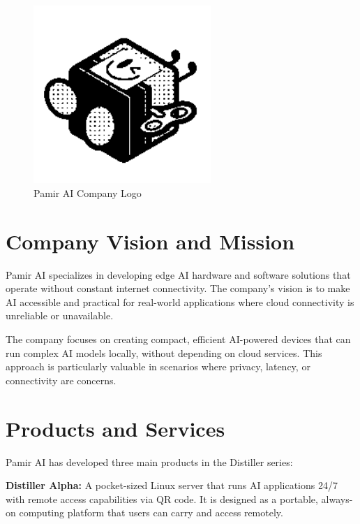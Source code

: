 \documentclass[12pt,a4paper]{report}
\begin{document}
\begin{figure}[htbp]
    \centering
    \includegraphics[width=0.6\textwidth]{pamirai_logo.png}
    \caption{Pamir AI Company Logo}
\end{figure}

\section{Company Vision and Mission}

Pamir AI specializes in developing edge AI hardware and software solutions that operate without constant internet connectivity. The company's vision is to make AI accessible and practical for real-world applications where cloud connectivity is unreliable or unavailable.

\vspace{0.3cm}

The company focuses on creating compact, efficient AI-powered devices that can run complex AI models locally, without depending on cloud services. This approach is particularly valuable in scenarios where privacy, latency, or connectivity are concerns.

\section{Products and Services}

Pamir AI has developed three main products in the Distiller series:

\vspace{0.3cm}

\textbf{Distiller Alpha:} A pocket-sized Linux server that runs AI applications 24/7 with remote access capabilities via QR code. It is designed as a portable, always-on computing platform that users can carry and access remotely.
\end{document}
